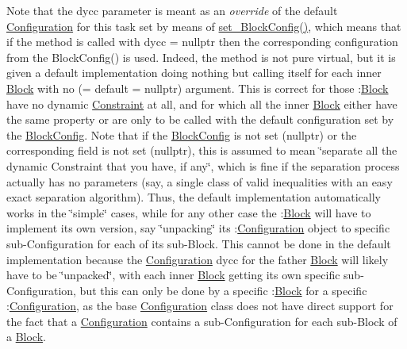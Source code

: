Note that the dycc parameter is meant as an {\itshape override} of the default \mbox{\hyperlink{class_s_m_spp__di__unipi__it_1_1_configuration}{Configuration}} for this task set by means of \mbox{\hyperlink{class_s_m_spp__di__unipi__it_1_1_block_a18d411b740a47db00d15083c5c7ef2ba}{set\+\_\+\+Block\+Config()}}, which means that if the method is called with dycc = nullptr then the corresponding configuration from the Block\+Config() is used. Indeed, the method is not pure virtual, but it is given a default implementation doing nothing but calling itself for each inner \mbox{\hyperlink{class_s_m_spp__di__unipi__it_1_1_block}{Block}} with no (= default = nullptr) argument. This is correct for those \+:\mbox{\hyperlink{class_s_m_spp__di__unipi__it_1_1_block}{Block}} have no dynamic \mbox{\hyperlink{class_s_m_spp__di__unipi__it_1_1_constraint}{Constraint}} at all, and for which all the inner \mbox{\hyperlink{class_s_m_spp__di__unipi__it_1_1_block}{Block}} either have the same property or are only to be called with the default configuration set by the \mbox{\hyperlink{class_s_m_spp__di__unipi__it_1_1_block_config}{Block\+Config}}. Note that if the \mbox{\hyperlink{class_s_m_spp__di__unipi__it_1_1_block_config}{Block\+Config}} is not set (nullptr) or the corresponding field is not set (nullptr), this is assumed to mean \char`\"{}separate all the dynamic Constraint that you have, if any\char`\"{}, which is fine if the separation process actually has no parameters (say, a single class of valid inequalities with an easy exact separation algorithm). Thus, the default implementation automatically works in the \char`\"{}simple\char`\"{} cases, while for any other case the \+:\mbox{\hyperlink{class_s_m_spp__di__unipi__it_1_1_block}{Block}} will have to implement its own version, say \char`\"{}unpacking\char`\"{} its \+:\mbox{\hyperlink{class_s_m_spp__di__unipi__it_1_1_configuration}{Configuration}} object to specific sub-\/\+Configuration for each of its sub-\/\+Block. This cannot be done in the default implementation because the \mbox{\hyperlink{class_s_m_spp__di__unipi__it_1_1_configuration}{Configuration}} dycc for the father \mbox{\hyperlink{class_s_m_spp__di__unipi__it_1_1_block}{Block}} will likely have to be \char`\"{}unpacked\char`\"{}, with each inner \mbox{\hyperlink{class_s_m_spp__di__unipi__it_1_1_block}{Block}} getting its own specific sub-\/\+Configuration, but this can only be done by a specific \+:\mbox{\hyperlink{class_s_m_spp__di__unipi__it_1_1_block}{Block}} for a specific \+:\mbox{\hyperlink{class_s_m_spp__di__unipi__it_1_1_configuration}{Configuration}}, as the base \mbox{\hyperlink{class_s_m_spp__di__unipi__it_1_1_configuration}{Configuration}} class does not have direct support for the fact that a \mbox{\hyperlink{class_s_m_spp__di__unipi__it_1_1_configuration}{Configuration}} contains a sub-\/\+Configuration for each sub-\/\+Block of a \mbox{\hyperlink{class_s_m_spp__di__unipi__it_1_1_block}{Block}}. \mbox{\label{class_s_m_spp__di__unipi__it_1_1_block_ab90d0f60518eee75370e29c95bae4522}} 
